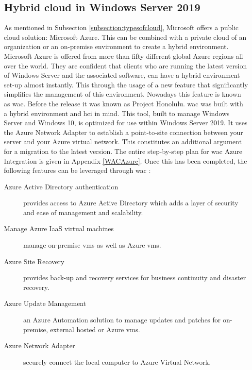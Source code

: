 \subsection{Hybrid cloud in Windows Server 2019}
\label{hybrid-cloud-windows-server-2019}
As mentioned in Subsection \ref{subsection:typesofcloud}, Microsoft offers a public cloud solution: Microsoft Azure. 
This can be combined with a private cloud of an organization or an on-premise environment to create a hybrid environment. 
Microsoft Azure is offered from more than fifty different global Azure regions all over the world. 
They are confident that clients who are running the latest version of Windows Server and the associated software, can have a hybrid environment set-up almost instantly. 
This through the usage of a new feature that significantly simplifies the management of this environment. 
Nowadays this feature is known as \acrfull{wac}. 
Before the release it was known as Project Honolulu. 
\acrlong{wac} was built with a hybrid environment and \acrshort{hci} in mind. 
This tool, built to manage Windows Server and Windows 10, is optimized for use within Windows Server 2019. 
It uses the Azure Network Adapter to establish a point-to-site connection between your server and your Azure virtual network. 
This constitutes an additional argument for a migration to the latest version. 
The entire step-by-step plan for \acrlong{wac} Azure Integration is given in Appendix \ref{WACAzure}. 
Once this has been completed, the following features can be leveraged through \acrlong{wac} \autocite{Washburn2018}:

\begin{description}
\item [Azure Active Directory authentication] provides access to Azure Active Directory which adds a layer of security and ease of management and scalability.
\item [Manage Azure IaaS virtual machines] manage on-premise \acrshort{vm}s as well as Azure \acrshort{vm}s.
\item [Azure Site Recovery] provides back-up and recovery services for business continuity and disaster recovery.
\item [Azure Update Management] an Azure Automation solution to manage updates and patches for on-premise, external hosted or Azure \acrshort{vm}s.
\item [Azure Network Adapter] securely connect the local computer to Azure Virtual Network.
\end{description}

